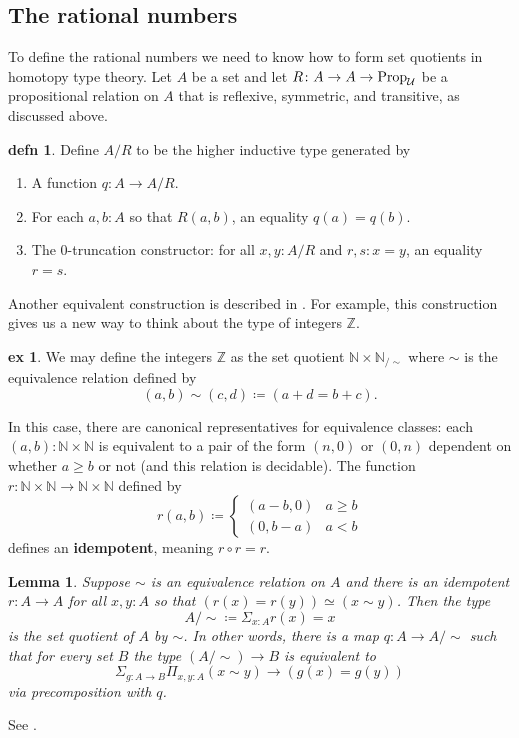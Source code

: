 \documentclass{amsart}
\theoremstyle{theorem}
\newtheorem*{lem}{Lemma}
\theoremstyle{definition}
\newtheorem*{defn}{defn}
\newtheorem*{ex}{ex}
\theoremstyle{remark}
\newcommand{\0}{\mathbbe{0}}
\newcommand{\1}{\mathbbe{1}}
\newcommand{\2}{\mathbbe{2}}
\newcommand{\3}{\mathbbe{3}}
\newcommand{\4}{\mathbbe{4}}
\newcommand{\NN}{\mathbb{N}}
\newcommand{\ZZ}{\mathbb{Z}}
\newcommand{\type}[1]{{\textup{#1}}}
\newcommand{\UU}{{\mathcal{U}}}
\newcommand{\Prop}{\type{Prop}_{\UU}}
\begin{document}
\subsection*{The rational numbers}

To define the rational numbers we need to know how to form set quotients in homotopy type theory. Let $A$ be a set and let $R \colon A \to A \to \Prop$ be a propositional relation on $A$ that is reflexive, symmetric, and transitive, as discussed above. 

\begin{defn} Define $A/R$ to be the higher inductive type generated by
\begin{enumerate}
\item A function $q \colon A \to A/R$.
\item For each $a,b :A$ so that $R(a,b)$, an equality $q(a)=q(b)$.
\item The 0-truncation constructor: for all $x,y : A/R$ and $r,s : x= y$, an equality $r=s$.
\end{enumerate}
\end{defn}

Another equivalent construction is described in \cite[\S 18.1]{Rijke}. For example, this construction gives us a new way to think about the type of integers $\ZZ$.

\begin{ex} We may define the integers $\ZZ$ as the set quotient $\NN \times \NN_{/\sim}$ where $\sim$ is the equivalence relation defined by
\[ (a,b) \sim (c,d) \coloneq (a+d = b +c).\]
\end{ex}

In this case, there are canonical representatives for equivalence classes: each $(a,b) : \NN \times \NN$ is equivalent to a pair of the form $(n,0)$ or $(0,n)$ dependent on whether $a \geq b$ or not (and this relation is decidable). The function $r \colon \NN \times \NN \to \NN \times \NN$ defined by
\[ r(a,b) \coloneq \begin{cases} (a-b,0) & a \geq b \\ (0, b-a) & a < b \end{cases}\]
defines an \textbf{idempotent}, meaning $r \circ r =r $. 

\begin{lem} Suppose $\sim$ is an equivalence relation on $A$ and there is an idempotent $r \colon A \to A$ for all $x,y :A$ so that $(r(x)=r(y)) \simeq (x \sim y)$. Then the type
\[ A/\sim \coloneq \Sigma_{x:A} r(x)=x\]
is the set quotient of $A$ by $\sim$. In other words, there is a map $q \colon A \to A/\sim$ such that for every set $B$ the type $(A /\sim) \to B$ is equivalent to
\[ \Sigma_{g : A \to B} \Pi_{x,y:A} (x \sim y) \to (g(x)=g(y))\]
via precomposition with $q$.
\end{lem}
 See \cite[6.10.8]{book-hott}.
 
\end{document}
